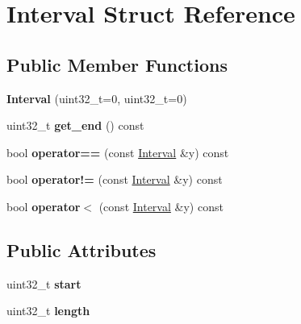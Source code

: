 \hypertarget{structInterval}{}\section{Interval Struct Reference}
\label{structInterval}
\subsection*{Public Member Functions}
\begin{DoxyCompactItemize}
\item 
\mbox{\label{structInterval_a78d2253cb87b317df6e216e5f3ada9a8}} 
{\bfseries Interval} (uint32\+\_\+t=0, uint32\+\_\+t=0)
\item 
\mbox{\label{structInterval_a24c9744f7ebbb6fa48e0b8351a55a21d}} 
uint32\+\_\+t {\bfseries get\+\_\+end} () const
\item 
\mbox{\label{structInterval_a7674533d153291d1d101a52dcf8cd42e}} 
bool {\bfseries operator==} (const \hyperlink{structInterval}{Interval} \&y) const
\item 
\mbox{\label{structInterval_ac867e22fe264aa5ecba12d329b5173ce}} 
bool {\bfseries operator!=} (const \hyperlink{structInterval}{Interval} \&y) const
\item 
\mbox{\label{structInterval_a294801291a6c1a8e5a1ba9267969b056}} 
bool {\bfseries operator$<$} (const \hyperlink{structInterval}{Interval} \&y) const
\end{DoxyCompactItemize}
\subsection*{Public Attributes}
\begin{DoxyCompactItemize}
\item 
\mbox{\label{structInterval_a2bf5e29aa46cc6b113e23e39b95962e2}} 
uint32\+\_\+t {\bfseries start}
\item 
\mbox{\label{structInterval_a8e9c1ca5369e1449ef6a1971dee96b97}} 
uint32\+\_\+t {\bfseries length}
\end{DoxyCompactItemize}
